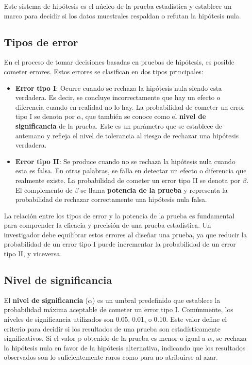 \documentclass[
  letterpaper,
  DIV=11,
  numbers=noendperiod]{scrreprt}
\begin{document}
Este sistema de hipótesis es el núcleo de la prueba estadística y
establece un marco para decidir si los datos muestrales respaldan o
refutan la hipótesis nula.

\subsection{Tipos de error}\label{tipos-de-error}

En el proceso de tomar decisiones basadas en pruebas de hipótesis, es
posible cometer errores. Estos errores se clasifican en dos tipos
principales:

\begin{itemize}
\item
  \textbf{Error tipo I}: Ocurre cuando se rechaza la hipótesis nula
  siendo esta verdadera. Es decir, se concluye incorrectamente que hay
  un efecto o diferencia cuando en realidad no lo hay. La probabilidad
  de cometer un error tipo I se denota por \(\alpha\), que también se
  conoce como el \textbf{nivel de significancia} de la prueba. Este es
  un parámetro que se establece de antemano y refleja el nivel de
  tolerancia al riesgo de rechazar una hipótesis verdadera.
\item
  \textbf{Error tipo II}: Se produce cuando no se rechaza la hipótesis
  nula cuando esta es falsa. En otras palabras, se falla en detectar un
  efecto o diferencia que realmente existe. La probabilidad de cometer
  un error tipo II se denota por \(\beta\). El complemento de \(\beta\)
  se llama \textbf{potencia de la prueba} y representa la probabilidad
  de rechazar correctamente una hipótesis nula falsa.
\end{itemize}

La relación entre los tipos de error y la potencia de la prueba es
fundamental para comprender la eficacia y precisión de una prueba
estadística. Un investigador debe equilibrar estos errores al diseñar
una prueba, ya que reducir la probabilidad de un error tipo I puede
incrementar la probabilidad de un error tipo II, y viceversa.

\subsection{Nivel de significancia}\label{nivel-de-significancia}

El \textbf{nivel de significancia} (\(\alpha\)) es un umbral predefinido
que establece la probabilidad máxima aceptable de cometer un error tipo
I. Comúnmente, los niveles de significancia utilizados son 0.05, 0.01, o
0.10. Este valor define el criterio para decidir si los resultados de
una prueba son estadísticamente significativos. Si el valor p obtenido
de la prueba es menor o igual a \(\alpha\), se rechaza la hipótesis nula
en favor de la hipótesis alternativa, indicando que los resultados
observados son lo suficientemente raros como para no atribuirse al azar.
\end{document}
